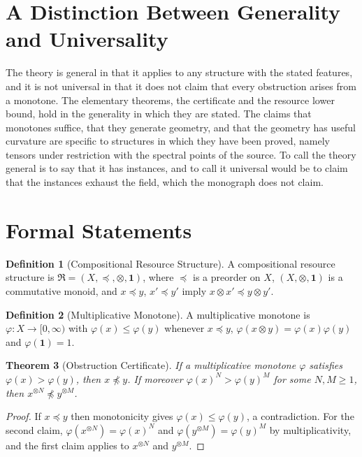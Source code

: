 \documentclass[11pt,letterpaper]{report}
\theoremstyle{plain}
\newtheorem{theorem}{Theorem}[chapter]
\theoremstyle{definition}
\newtheorem{definition}[theorem]{Definition}
\theoremstyle{remark}
\begin{document}
\section{A Distinction Between Generality and Universality}

The theory is general in that it applies to any structure with the stated features, and it is not universal in that it does not claim that every obstruction arises from a monotone. The elementary theorems, the certificate and the resource lower bound, hold in the generality in which they are stated. The claims that monotones suffice, that they generate geometry, and that the geometry has useful curvature are specific to structures in which they have been proved, namely tensors under restriction with the spectral points of the source. To call the theory general is to say that it has instances, and to call it universal would be to claim that the instances exhaust the field, which the monograph does not claim.

\section{Formal Statements}

\begin{definition}[Compositional Resource Structure]\label{def:resstructure}
A compositional resource structure is $\mathfrak R=(X,\preceq,\otimes,\mathbf 1)$, where $\preceq$ is a preorder on $X$, $(X,\otimes,\mathbf 1)$ is a commutative monoid, and $x\preceq y$, $x'\preceq y'$ imply $x\otimes x'\preceq y\otimes y'$.
\end{definition}

\begin{definition}[Multiplicative Monotone]\label{def:monotone}
A multiplicative monotone is $\varphi:X\to[0,\infty)$ with $\varphi(x)\le\varphi(y)$ whenever $x\preceq y$, $\varphi(x\otimes y)=\varphi(x)\varphi(y)$ and $\varphi(\mathbf 1)=1$.
\end{definition}

\begin{theorem}[Obstruction Certificate]\label{th:certificate}
If a multiplicative monotone $\varphi$ satisfies $\varphi(x)>\varphi(y)$, then $x\not\preceq y$. If moreover $\varphi(x)^N>\varphi(y)^M$ for some $N,M\ge1$, then $x^{\otimes N}\not\preceq y^{\otimes M}$.
\end{theorem}
\begin{proof}
If $x\preceq y$ then monotonicity gives $\varphi(x)\le\varphi(y)$, a contradiction. For the second claim, $\varphi(x^{\otimes N})=\varphi(x)^N$ and $\varphi(y^{\otimes M})=\varphi(y)^M$ by multiplicativity, and the first claim applies to $x^{\otimes N}$ and $y^{\otimes M}$.
\end{proof}
\end{document}
